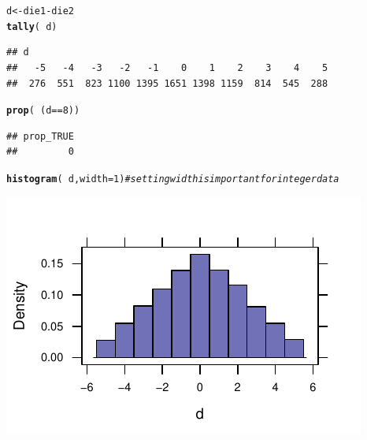 \documentclass[twoside]{book}\usepackage[]{graphicx}\usepackage[]{xcolor}
\makeatletter
\def\maxwidth{ %
  \ifdim\Gin@nat@width>\linewidth
    \linewidth
  \else
    \Gin@nat@width
  \fi
}
\newcommand{\hlnum}[1]{\textcolor[rgb]{0.686,0.059,0.569}{#1}}%
\newcommand{\hlcom}[1]{\textcolor[rgb]{0.678,0.584,0.686}{\textit{#1}}}%
\newcommand{\hlopt}[1]{\textcolor[rgb]{0,0,0}{#1}}%
\newcommand{\hlstd}[1]{\textcolor[rgb]{0.345,0.345,0.345}{#1}}%
\newcommand{\hlkwb}[1]{\textcolor[rgb]{0.69,0.353,0.396}{#1}}%
\newcommand{\hlkwc}[1]{\textcolor[rgb]{0.333,0.667,0.333}{#1}}%
\newcommand{\hlkwd}[1]{\textcolor[rgb]{0.737,0.353,0.396}{\textbf{#1}}}%
\newenvironment{kframe}{%
 \def\at@end@of@kframe{}%
 \ifinner\ifhmode%
  \def\at@end@of@kframe{\end{minipage}}%
  \begin{minipage}{\columnwidth}%
 \fi\fi%
 \def\FrameCommand##1{\hskip\@totalleftmargin \hskip-\fboxsep
 \colorbox{shadecolor}{##1}\hskip-\fboxsep
     \hskip-\linewidth \hskip-\@totalleftmargin \hskip\columnwidth}%
 \MakeFramed {\advance\hsize-\width
   \@totalleftmargin\z@ \linewidth\hsize
   \@setminipage}}%
 {\par\unskip\endMakeFramed%
 \at@end@of@kframe}
\newenvironment{knitrout}{}{} %
\makeatother
\begin{document}
\begin{solution}
\begin{knitrout}
\color{fgcolor}\begin{kframe}
\begin{alltt}
\hlstd{d} \hlkwb{<-} \hlstd{die1} \hlopt{-} \hlstd{die2}
\hlkwd{tally}\hlstd{(} \hlopt{~} \hlstd{d )}
\end{alltt}
\begin{verbatim}
## d
##   -5   -4   -3   -2   -1    0    1    2    3    4    5 
##  276  551  823 1100 1395 1651 1398 1159  814  545  288
\end{verbatim}
\begin{alltt}
\hlkwd{prop}\hlstd{(} \hlopt{~} \hlstd{(d} \hlopt{==} \hlnum{8}\hlstd{) )}
\end{alltt}
\begin{verbatim}
## prop_TRUE 
##         0
\end{verbatim}
\begin{alltt}
\hlkwd{histogram}\hlstd{(} \hlopt{~}\hlstd{d,} \hlkwc{width}\hlstd{=}\hlnum{1} \hlstd{)}    \hlcom{# setting width is important for integer data}
\end{alltt}
\end{kframe}

{\centering \includegraphics[width=\maxwidth]{figures/fig-unnamed-chunk-53-1} 

}



\end{knitrout}
\end{solution}
\end{document}
